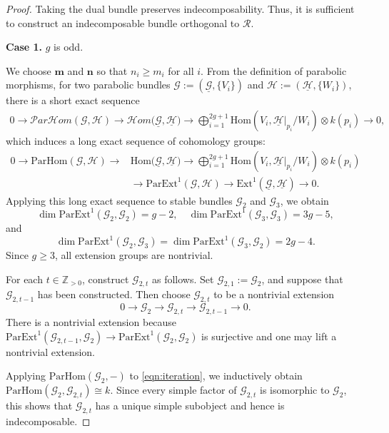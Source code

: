 \documentclass[10pt,a4paper]{amsart}
\def\Ext{\mathrm{Ext} }
\newcommand{\ZZ}{\mathbb{Z} }
\newcommand{\bm}{\mathbf{m} }
\newcommand{\bn}{\mathbf{n} }
\newcommand{\cG}{\mathcal{G} }
\newcommand{\cH}{\mathcal{H} }
\def\cHom{\mathcal{H}om }
\newcommand{\cR}{\mathcal{R} }
\newcommand{\cpHom}{\mathcal{P}ar\cHom}
\def\pExt{\mathrm{ParExt} }
\newcommand{\pHom}{\mathrm{ParHom}}
\def\rHom{\mathrm{Hom} }
\begin{document}
\begin{proof}
Taking the dual bundle preserves indecomposability. Thus, it is sufficient to construct an indecomposable bundle orthogonal to \(\cR\).

\textbf{Case 1.} \(g\) is odd.

We choose \(\bm\) and \(\bn\) so that \(n_i \ge m_i\) for all \(i\). From the definition of parabolic morphisms, for two parabolic bundles \(\cG := (\underline{\cG}, \{V_i\})\) and \(\cH := (\underline{\cH}, \{W_i\})\), there is a short exact sequence
\begin{align}\label{eq:par_ex_seq}
0\to \cpHom(\cG,\cH)\to\cHom\bigl(\underline{\cG},\underline{\cH}\bigr)\to\bigoplus_{i=1}^{2g+1}\rHom(V_i,\underline{\cH}|_{p_i}/W_i)\otimes k(p_i)\to 0,
\end{align}
which induces a long exact sequence of cohomology groups:
\begin{equation}\label{eqn:par_long_seq}
\begin{split}
  0\to \pHom(\cG,\cH)\to&\rHom\bigl(\underline{\cG},\underline{\cH}\bigr)\to\bigoplus_{i=1}^{2g+1}\rHom(V_i,\underline{\cH}|_{p_i}/W_i)\otimes k(p_i)\\
  &\to \pExt^1(\cG, \cH) \to \Ext^1(\underline{\cG}, \underline{\cH}) \to 0.
\end{split}
\end{equation}
Applying this long exact sequence to stable bundles \(\cG_2\) and \(\cG_3\), we obtain
\[\dim \pExt^1(\cG_2, \cG_2) = g - 2, \quad \dim \pExt^1(\cG_3, \cG_3) = 3g - 5,\]
and
\[\dim \pExt^1(\cG_2, \cG_3) = \dim \pExt^1(\cG_3, \cG_2) = 2g - 4.\]
Since \(g \ge 3\), all extension groups are nontrivial.

For each \(t \in \ZZ_{>0}\), construct \(\cG_{2,t}\) as follows. Set \(\cG_{2,1}:=\cG_2\), and suppose that \(\cG_{2,t-1}\) has been constructed. Then choose \(\cG_{2,t}\) to be a nontrivial extension
\begin{equation}\label{eqn:iteration}
0 \to \cG_2 \to \cG_{2,t} \to \cG_{2,t-1} \to 0.
\end{equation}
There is a nontrivial extension because \(\pExt^1(\cG_{2,t-1},\cG_2)\to\pExt^1(\cG_2,\cG_2)\) is surjective and one may lift a nontrivial extension.

Applying \(\pHom(\cG_2,-)\) to \eqref{eqn:iteration}, we inductively obtain \(\pHom(\cG_2,\cG_{2,t})\cong k\). Since every simple factor of \(\cG_{2,t}\) is isomorphic to \(\cG_2\), this shows that \(\cG_{2,t}\) has a unique simple subobject and hence is indecomposable.


\end{proof}
\end{document}
